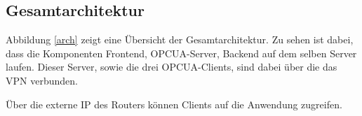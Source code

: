 \subsection{Gesamtarchitektur}

Abbildung \ref{arch} zeigt eine Übersicht der Gesamtarchitektur.
Zu sehen ist dabei, dass die Komponenten Frontend, OPCUA-Server, Backend auf dem selben Server laufen.
Dieser Server, sowie die drei OPCUA-Clients, sind dabei über die das VPN verbunden.

Über die externe IP des Routers können Clients auf die Anwendung zugreifen.
